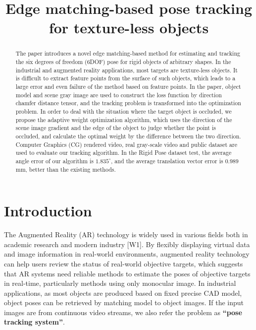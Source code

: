 \documentclass{cta-author}
\begin{document}

\title{Edge matching-based pose tracking for texture-less objects}

\author{     }

\address{
}

\begin{abstract}
 The paper introduces a novel edge matching-based method for 
estimating and tracking the six degrees of freedom (6DOF) pose for rigid objects
 of arbitrary shapes. In the industrial and augmented reality applications, 
 most targets are texture-less objects. It is difficult to extract feature points 
 from the surface of such objects, which leads to a large error and even failure of the 
 method based on feature points. In the paper, object model and scene gray image are used to 
 construct the loss function by direction chamfer distance tensor, and the tracking problem 
 is transformed into the optimization problem. In order to deal with the situation where the 
 target object is occluded, we propose the adaptive weight optimization algorithm, which uses 
 the direction of the scene image gradient and the edge of the object to judge whether the 
 point is occluded, and calculate the optimal weight by the difference between the two direction.
  Computer Graphics (CG) rendered video, real gray-scale video and public dataset are used to
  evaluate our tracking algorithm. In the Rigid Pose dataset test, the average angle error of 
  our algorithm is $1.835^{\circ}$, 
and the average translation vector error is 0.989 mm, better than the existing methods. 

\end{abstract}

\maketitle

\section{Introduction}\label{sec1}
The Augmented Reality (AR) technology is widely used in various fields both in academic research 
and modern industry [W1]. By flexibly displaying virtual data and image information in real-world 
environments, augmented reality technology can help users review the status of real-world objective 
targets, which suggests that AR systems need reliable methods to estimate the poses of objective targets 
in real-time, particularly methods using only monocular image. In industrial applications, as most objects 
are produced based on fixed precise CAD model, object poses can be retrieved by matching model to object images.
If the input images are from continuous video streams, we also refer the problem as \textbf{“pose tracking system”}.
\end{document}
